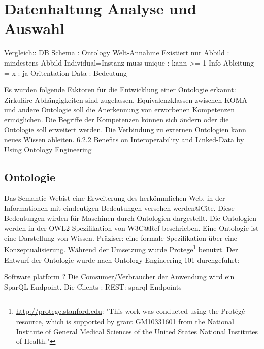 \documentclass[
12pt,
english,
ngerman,
headsepline,
twoside,
openright,
numbers=noenddot,version=first
]{scrreprt}
\begin{document}
\section{Datenhaltung Analyse und Auswahl}


Vergleich:: DB Schema                       : Ontology
Welt-Annahme Existiert nur Abbild           : mindestens Abbild
Individual=Instanz muss unique              : kann >= 1
Info Ableitung = x                          : ja
Oritentation    Data                        : Bedeutung

Es wurden folgende Faktoren für die Entwicklung einer Ontologie erkannt:
Zirkuläre Abhängigkeiten sind zugelassen.  
Equivalenzklassen zwischen KOMA und andere Ontologie soll die Anerkennung von erworbenen Kompetenzen ermöglichen.
Die Begriffe der Kompetenzen können sich ändern oder die Ontologie soll erweitert werden.
Die Verbindung zu externen Ontologien kann neues Wissen ableiten.
6.2.2 \cite{OntoCloud}Benefits on Interoperability and Linked-Data by Using
Ontology Engineering

\subsection{Ontologie}

Das \glqq Semantic Web\grqq ist eine Erweiterung des herkömmlichen Web, in der Informationen mit eindeutigen Bedeutungen versehen werden@Cite. Diese Bedeutungen wirden für Maschinen durch Ontologien dargestellt. Die Ontologien werden in der OWL2 Spezifikation von W3C@Ref beschrieben. 
Eine Ontologie ist eine Darstellung von Wissen. Präziser: eine formale Spezifikation über eine Konzeptualisierung\cite{OntoWhat}.
Während der Umsetzung wurde Protege\footnote{\url{http://protege.stanford.edu}: "This work was conducted using the Protégé resource, which is supported by grant GM10331601 from the National Institute of General Medical Sciences of the United States National Institutes of Health."} benutzt.
Der Entwurf der Ontologie wurde nach Ontology-Engineering-101
 durchgefuhrt: 


Software platform ? 
Die Comsumer/Verbraucher der Anwendung wird ein SparQL-Endpoint\cite{SparqlLearn}.
Die Clients : REST: sparql Endpoints
\end{document}
